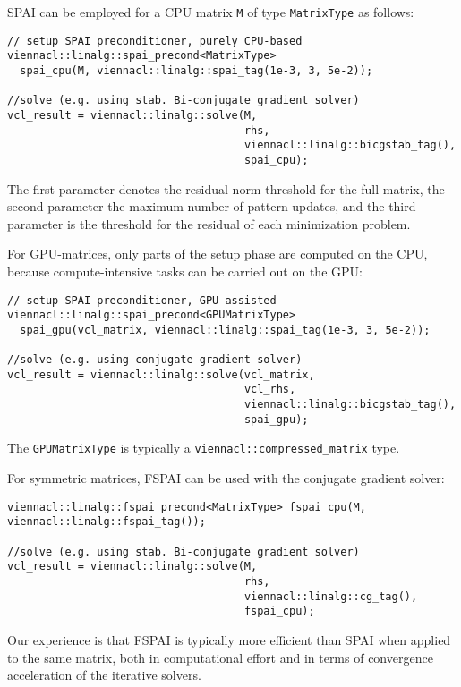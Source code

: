 SPAI can be employed for a CPU matrix \lstinline|M| of type \lstinline|MatrixType| as follows:
\begin{lstlisting}
// setup SPAI preconditioner, purely CPU-based
viennacl::linalg::spai_precond<MatrixType>
  spai_cpu(M, viennacl::linalg::spai_tag(1e-3, 3, 5e-2));

//solve (e.g. using stab. Bi-conjugate gradient solver)
vcl_result = viennacl::linalg::solve(M,
                                     rhs,
                                     viennacl::linalg::bicgstab_tag(),
                                     spai_cpu);
\end{lstlisting}
The first parameter denotes the residual norm threshold for the full matrix, the second parameter the maximum number of pattern updates, and the third
parameter is the threshold for the residual of each minimization problem.

For GPU-matrices, only parts of the setup phase are computed on the CPU, because compute-intensive tasks can be carried out on the GPU:
\begin{lstlisting}
// setup SPAI preconditioner, GPU-assisted
viennacl::linalg::spai_precond<GPUMatrixType>
  spai_gpu(vcl_matrix, viennacl::linalg::spai_tag(1e-3, 3, 5e-2));

//solve (e.g. using conjugate gradient solver)
vcl_result = viennacl::linalg::solve(vcl_matrix,
                                     vcl_rhs,
                                     viennacl::linalg::bicgstab_tag(),
                                     spai_gpu);
\end{lstlisting}
The \lstinline|GPUMatrixType| is typically a \lstinline|viennacl::compressed_matrix| type.

For symmetric matrices, FSPAI can be used with the conjugate gradient solver:
\begin{lstlisting}
viennacl::linalg::fspai_precond<MatrixType> fspai_cpu(M, viennacl::linalg::fspai_tag());

//solve (e.g. using stab. Bi-conjugate gradient solver)
vcl_result = viennacl::linalg::solve(M,
                                     rhs,
                                     viennacl::linalg::cg_tag(),
                                     fspai_cpu);
\end{lstlisting}
Our experience is that FSPAI is typically more efficient than SPAI when applied to the same matrix, both in computational effort and in terms of convergence
acceleration of the iterative solvers.


